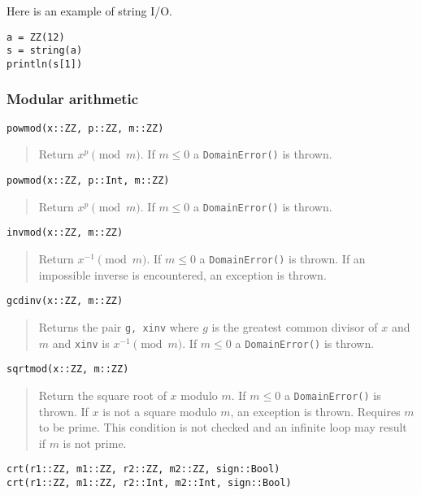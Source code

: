 \documentclass[a4paper,10pt]{article}
\newcommand{\code}{\lstinline}
\newcommand{\desc}[1]{\vspace{-3mm}\begin{quote}#1\end{quote}}
\begin{document}
{{{Here is an example of string I/O.

\begin{lstlisting}
a = ZZ(12)
s = string(a)
println(s[1])
\end{lstlisting}

\subsubsection{Modular arithmetic}

\begin{lstlisting}
powmod(x::ZZ, p::ZZ, m::ZZ)
\end{lstlisting}

\desc{Return $x^p \pmod{m}$. If $m \leq 0$ a \code{DomainError()} is thrown.}

\begin{lstlisting}
powmod(x::ZZ, p::Int, m::ZZ)
\end{lstlisting}

\desc{Return $x^p \pmod{m}$. If $m \leq 0$ a \code{DomainError()} is thrown.}

\begin{lstlisting}
invmod(x::ZZ, m::ZZ)
\end{lstlisting}

\desc{Return $x^{-1} \pmod{m}$. If $m \leq 0$ a \code{DomainError()} is thrown. If
an impossible inverse is encountered, an exception is thrown.}

\begin{lstlisting}
gcdinv(x::ZZ, m::ZZ)
\end{lstlisting}

\desc{Returns the pair \code{g, xinv} where $g$ is the greatest common divisor of
$x$ and $m$ and \code{xinv} is $x^{-1} \pmod{m}$. If $m \leq 0$ a 
\code{DomainError()} is thrown.}

\begin{lstlisting}
sqrtmod(x::ZZ, m::ZZ)
\end{lstlisting}

\desc{Return the square root of $x$ modulo $m$. If $m \leq 0$ a \code{DomainError()}
is thrown. If $x$ is not a square modulo $m$, an exception is thrown. Requires $m$ to
be prime. This condition is not checked and an infinite loop may result if $m$ is
not prime.}

\begin{lstlisting}
crt(r1::ZZ, m1::ZZ, r2::ZZ, m2::ZZ, sign::Bool)
crt(r1::ZZ, m1::ZZ, r2::Int, m2::Int, sign::Bool)
\end{lstlisting}

}}}
\end{document}
